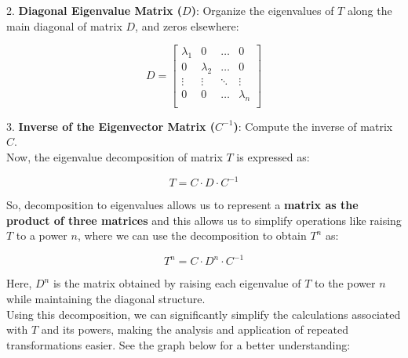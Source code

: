 \documentclass[10pt,a4paper]{Template}
\begin{document}
\begin{minipage}{0.48\textwidth}

\vspace{-7.1675cm}

2. \textbf{Diagonal Eigenvalue Matrix ($D$)}: Organize the eigenvalues of $T$ along the main diagonal of matrix $D$, and zeros elsewhere:

\[ D = \begin{bmatrix} 
\lambda_1 & 0 & \dots & 0 \\
0 & \lambda_2 & \dots & 0 \\
\vdots & \vdots & \ddots & \vdots \\
0 & 0 & \dots & \lambda_n \\
\end{bmatrix} \]

3. \textbf{Inverse of the Eigenvector Matrix ($C^{-1}$)}: Compute the inverse of matrix $C$. \\

Now, the eigenvalue decomposition of matrix $T$ is expressed as:

\[ T = C \cdot D \cdot C^{-1} \]

So, decomposition to eigenvalues allows us to represent a \textbf{matrix as the product of three matrices} and this allows us to simplify operations like raising $T$ to a power $n$, where we can use the decomposition to obtain $T^n$ as:

\[ T^n = C \cdot D^n \cdot C^{-1} \]

Here, $D^n$ is the matrix obtained by raising each eigenvalue of $T$ to the power $n$ while maintaining the diagonal structure. \\

Using this decomposition, we can significantly simplify the calculations associated with $T$ and its powers, making the analysis and application of repeated transformations easier. See the graph below for a better understanding:

\vspace{0.3cm}
\begin{center}
\end{center}

\divider

\end{minipage}

\end{document}
